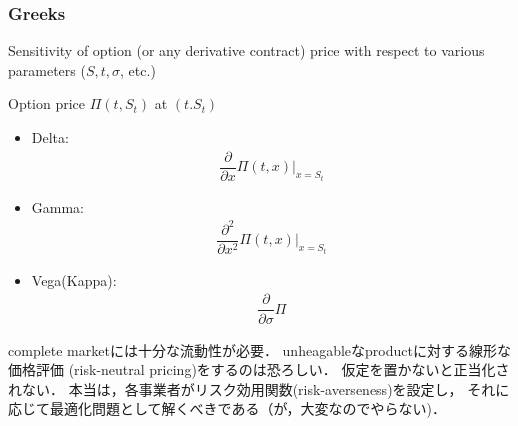 \documentclass[a4paper,11pt]{jsarticle}
\theoremstyle{definition}
\newcommand{\pd}[2]{\dfrac{\partial #1}{\partial #2}}
\newcommand{\pdd}[2]{\dfrac{{\partial}^2 #1} {\partial {#2}^2} }
\begin{document}
\subsubsection{Greeks}
Sensitivity of option (or any derivative contract) price
with respect to various parameters ($S,t,\sigma$, etc.)

Option price $\Pi(t,S_t)$ at $(t.S_t)$

\begin{itemize}
  \item Delta:
  \begin{align}
    \pd{}{x}\Pi(t,x)|_{x=S_t}
  \end{align}
  \item Gamma:
  \begin{align}
    \pdd{}{x} \Pi(t,x)|_{x=S_t}
  \end{align}
  \item Vega(Kappa):
  \begin{align}
    \pd{}{\sigma} \Pi
  \end{align}
\end{itemize}


complete marketには十分な流動性が必要．
unheagableなproductに対する線形な価格評価
(risk-neutral pricing)をするのは恐ろしい．
仮定を置かないと正当化されない．
本当は，各事業者がリスク効用関数(risk-averseness)を設定し，
それに応じて最適化問題として解くべきである（が，大変なのでやらない)．
\end{document}
